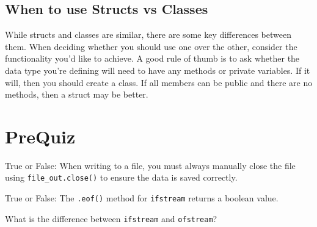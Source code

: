 \subsection{When to use Structs vs Classes}
While structs and classes are similar, there are some key differences between them. When deciding whether you should use one over the other, consider the functionality you'd like to achieve. A good rule of thumb is to ask whether the data type you're defining will need to have any methods or private variables. If it will, then you should create a class. If all members can be public and there are no methods, then a struct may be better.

\section{PreQuiz}
\begin{problem}
    True or False: When writing to a file, you must always manually close the file using \texttt{file_out.close()} to ensure the data is saved correctly.
\end{problem}

\begin{problem}
    True or False: The \texttt{.eof()} method for \texttt{ifstream} returns a boolean value.
\end{problem}

\begin{problem}
What is the difference between \texttt{ifstream} and \texttt{ofstream}?
\end{problem}

